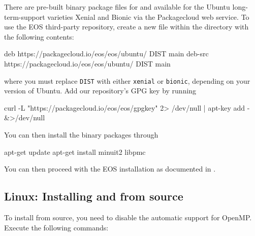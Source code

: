 There are pre-built binary package files for
 and  available for the Ubuntu
long-term-support varieties Xenial and Bionic via the Packagecloud web service.
To use the EOS third-party repository, create a new file  within
the directory  with the following contents:
\begin{file}
deb https://packagecloud.io/eos/eos/ubuntu/ DIST main
deb-src https://packagecloud.io/eos/eos/ubuntu/ DIST main
\end{file}
where you must replace \texttt{DIST} with either \texttt{xenial} or
\texttt{bionic}, depending on your version of Ubuntu. Add our repository's
GPG key by running
\begin{commandline}
curl -L "https://packagecloud.io/eos/eos/gpgkey" 2> /dev/null | apt-key add - &>/dev/null
\end{commandline}
You can then install the binary packages through
\begin{commandline}
apt-get update
apt-get install minuit2 libpmc
\end{commandline}

You can then proceed with the EOS installation as documented in .

\subsection{Linux: Installing  and  from source}
\label{sec:inst:depend:minuit2+pmclib-source}

To install  from source, you need to disable the automatic support
for OpenMP. Execute the following commands:

